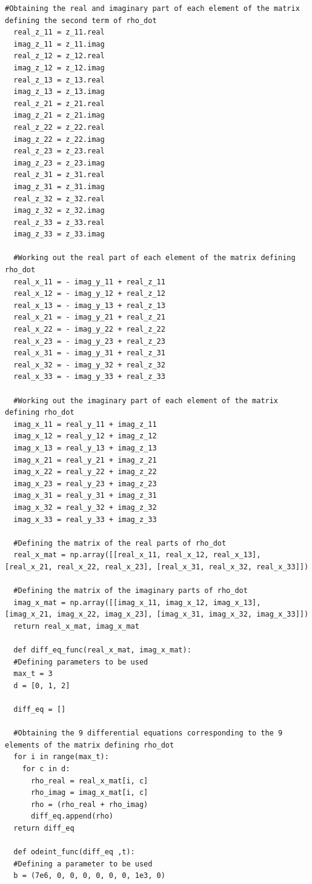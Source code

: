 \documentclass[12pt, a4paper]{article}
\begin{document}
\begin{lstlisting}[language=iPython]
  #Obtaining the real and imaginary part of each element of the matrix defining the second term of rho_dot
  real_z_11 = z_11.real
  imag_z_11 = z_11.imag
  real_z_12 = z_12.real
  imag_z_12 = z_12.imag
  real_z_13 = z_13.real
  imag_z_13 = z_13.imag
  real_z_21 = z_21.real
  imag_z_21 = z_21.imag
  real_z_22 = z_22.real
  imag_z_22 = z_22.imag
  real_z_23 = z_23.real
  imag_z_23 = z_23.imag
  real_z_31 = z_31.real
  imag_z_31 = z_31.imag
  real_z_32 = z_32.real
  imag_z_32 = z_32.imag
  real_z_33 = z_33.real
  imag_z_33 = z_33.imag

  #Working out the real part of each element of the matrix defining rho_dot
  real_x_11 = - imag_y_11 + real_z_11
  real_x_12 = - imag_y_12 + real_z_12
  real_x_13 = - imag_y_13 + real_z_13
  real_x_21 = - imag_y_21 + real_z_21
  real_x_22 = - imag_y_22 + real_z_22
  real_x_23 = - imag_y_23 + real_z_23
  real_x_31 = - imag_y_31 + real_z_31
  real_x_32 = - imag_y_32 + real_z_32
  real_x_33 = - imag_y_33 + real_z_33

  #Working out the imaginary part of each element of the matrix defining rho_dot
  imag_x_11 = real_y_11 + imag_z_11
  imag_x_12 = real_y_12 + imag_z_12
  imag_x_13 = real_y_13 + imag_z_13
  imag_x_21 = real_y_21 + imag_z_21
  imag_x_22 = real_y_22 + imag_z_22
  imag_x_23 = real_y_23 + imag_z_23
  imag_x_31 = real_y_31 + imag_z_31
  imag_x_32 = real_y_32 + imag_z_32
  imag_x_33 = real_y_33 + imag_z_33

  #Defining the matrix of the real parts of rho_dot
  real_x_mat = np.array([[real_x_11, real_x_12, real_x_13], [real_x_21, real_x_22, real_x_23], [real_x_31, real_x_32, real_x_33]])

  #Defining the matrix of the imaginary parts of rho_dot
  imag_x_mat = np.array([[imag_x_11, imag_x_12, imag_x_13], [imag_x_21, imag_x_22, imag_x_23], [imag_x_31, imag_x_32, imag_x_33]])
  return real_x_mat, imag_x_mat

  def diff_eq_func(real_x_mat, imag_x_mat):
  #Defining parameters to be used
  max_t = 3
  d = [0, 1, 2]

  diff_eq = []

  #Obtaining the 9 differential equations corresponding to the 9 elements of the matrix defining rho_dot
  for i in range(max_t):
    for c in d:
      rho_real = real_x_mat[i, c]
      rho_imag = imag_x_mat[i, c]
      rho = (rho_real + rho_imag)
      diff_eq.append(rho)
  return diff_eq

  def odeint_func(diff_eq ,t):
  #Defining a parameter to be used
  b = (7e6, 0, 0, 0, 0, 0, 0, 1e3, 0)


\end{lstlisting}
\end{document}
